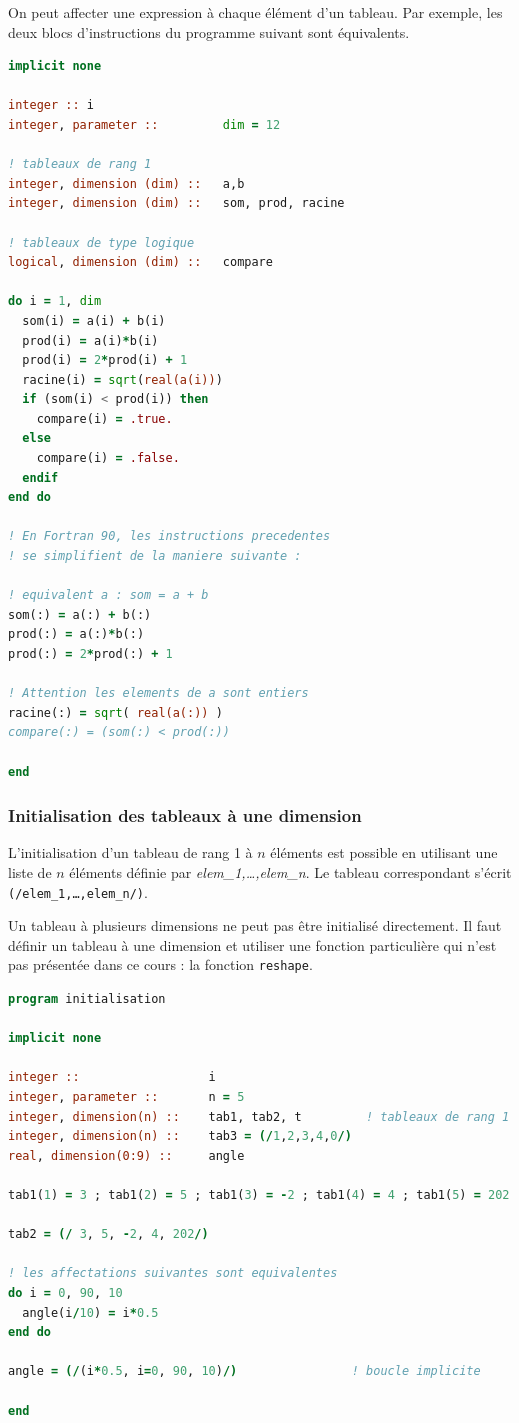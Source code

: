 \documentclass[a4paper,twoside]{article}
\begin{document}
On peut affecter une expression à chaque élément d'un tableau. Par exemple, les deux blocs d'instructions du programme suivant sont équivalents.

\begin{lstlisting}[language=Fortran]
implicit none 
  
integer :: i
integer, parameter ::         dim = 12

! tableaux de rang 1
integer, dimension (dim) ::   a,b
integer, dimension (dim) ::   som, prod, racine

! tableaux de type logique
logical, dimension (dim) ::   compare

do i = 1, dim 
  som(i) = a(i) + b(i) 
  prod(i) = a(i)*b(i)
  prod(i) = 2*prod(i) + 1 
  racine(i) = sqrt(real(a(i))) 
  if (som(i) < prod(i)) then 
    compare(i) = .true. 
  else 
    compare(i) = .false. 
  endif 
end do 

! En Fortran 90, les instructions precedentes
! se simplifient de la maniere suivante : 
    
! equivalent a : som = a + b
som(:) = a(:) + b(:)
prod(:) = a(:)*b(:)
prod(:) = 2*prod(:) + 1 

! Attention les elements de a sont entiers 
racine(:) = sqrt( real(a(:)) )
compare(:) = (som(:) < prod(:)) 

end
\end{lstlisting}

\subsubsection{Initialisation des tableaux à une dimension}

L'initialisation d'un tableau de rang 1 à $n$ éléments est possible en utilisant une liste de $n$ éléments définie par \emph{elem\_1,\ldots,elem\_n}. Le tableau correspondant s'écrit \texttt{(/elem\_1,\ldots,elem\_n/)}. 

Un tableau à plusieurs dimensions ne peut pas être initialisé directement. Il faut définir un tableau à une dimension et utiliser une fonction particulière qui n'est pas présentée dans ce cours : la fonction \texttt{reshape}.
 
\begin{lstlisting}[language=Fortran]
program initialisation

implicit none

integer ::                  i
integer, parameter ::       n = 5
integer, dimension(n) ::    tab1, tab2, t         ! tableaux de rang 1
integer, dimension(n) ::    tab3 = (/1,2,3,4,0/)
real, dimension(0:9) ::     angle

tab1(1) = 3 ; tab1(2) = 5 ; tab1(3) = -2 ; tab1(4) = 4 ; tab1(5) = 202

tab2 = (/ 3, 5, -2, 4, 202/)

! les affectations suivantes sont equivalentes
do i = 0, 90, 10
  angle(i/10) = i*0.5
end do

angle = (/(i*0.5, i=0, 90, 10)/)                ! boucle implicite

end
\end{lstlisting}
\end{document}

